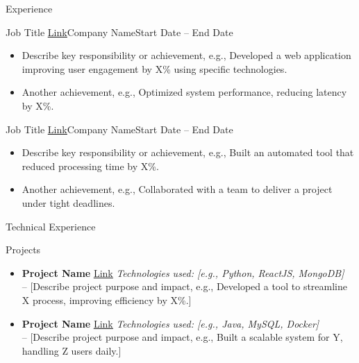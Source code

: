 \documentclass[]{mcdowellcv_3}%
\begin{document}
\begin{cvsection}{Experience}
    \begin{cvsubsection}{Job Title \underline{\href{https://yourlink.com}{Link}}}{Company Name}{Start Date -- End Date}
        \begin{itemize}
            \item Describe key responsibility or achievement, e.g., Developed a web application improving user engagement by X\% using specific technologies.
            \item Another achievement, e.g., Optimized system performance, reducing latency by X\%.
        \end{itemize}
    \end{cvsubsection}
    \begin{cvsubsection}{Job Title \underline{\href{https://yourlink.com}{Link}}}{Company Name}{Start Date -- End Date}
        \begin{itemize}
            \item Describe key responsibility or achievement, e.g., Built an automated tool that reduced processing time by X\%.
            \item Another achievement, e.g., Collaborated with a team to deliver a project under tight deadlines.
        \end{itemize}
    \end{cvsubsection}
\end{cvsection}

\begin{cvsection}{Technical Experience}
    \begin{cvsubsection}{Projects}{}{}
        \begin{itemize}
            \item \textbf{Project Name} \underline{\href{https://yourlink.com}{Link}} \textit{Technologies used: [e.g., Python, ReactJS, MongoDB]} \\
            -- [Describe project purpose and impact, e.g., Developed a tool to streamline X process, improving efficiency by X\%.]
            \item \textbf{Project Name} \underline{\href{https://yourlink.com}{Link}} \textit{Technologies used: [e.g., Java, MySQL, Docker]} \\
            -- [Describe project purpose and impact, e.g., Built a scalable system for Y, handling Z users daily.]
        \end{itemize}
    \end{cvsubsection}
\end{cvsection}
\end{document}
